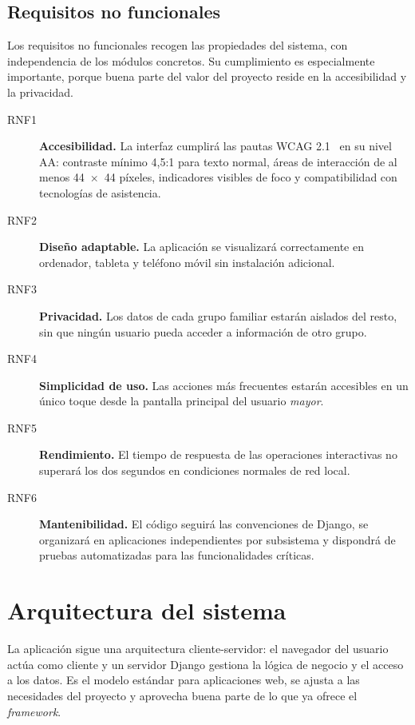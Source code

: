 \subsection{Requisitos no funcionales\label{SUB:REQ_NOFUNCIONALES}}

Los requisitos no funcionales recogen las propiedades del
sistema, con independencia de los módulos concretos. Su cumplimiento es
especialmente importante, porque buena parte del valor del proyecto
reside en la accesibilidad y la privacidad.

\begin{description}
  \item[RNF1] \textbf{Accesibilidad.} La interfaz cumplirá las pautas
  WCAG 2.1~\cite{wcag21} en su nivel AA: contraste mínimo 4{,}5:1 para texto
  normal, áreas de interacción de al menos 44~$\times$~44 píxeles,
  indicadores visibles de foco y compatibilidad con tecnologías de
  asistencia.
  \item[RNF2] \textbf{Diseño adaptable.} La aplicación se visualizará
  correctamente en ordenador, tableta y teléfono móvil sin instalación
  adicional.
  \item[RNF3] \textbf{Privacidad.} Los datos de cada grupo familiar
  estarán aislados del resto, sin que ningún usuario pueda acceder a
  información de otro grupo.
  \item[RNF4] \textbf{Simplicidad de uso.} Las acciones más frecuentes
  estarán accesibles en un único toque desde la pantalla principal del
  usuario \emph{mayor}.
  \item[RNF5] \textbf{Rendimiento.} El tiempo de respuesta de las
  operaciones interactivas no superará los dos segundos en condiciones
  normales de red local.
  \item[RNF6] \textbf{Mantenibilidad.} El código seguirá las convenciones
  de Django, se organizará en aplicaciones independientes por subsistema y
  dispondrá de pruebas automatizadas para las funcionalidades críticas.
\end{description}


\section{Arquitectura del sistema\label{SEC:DIS_ARQUITECTURA}}

La aplicación sigue una arquitectura cliente-servidor: el navegador del
usuario actúa como cliente y un servidor Django gestiona la lógica de
negocio y el acceso a los datos. Es el modelo estándar para aplicaciones
web, se ajusta a las necesidades del proyecto y aprovecha buena parte de
lo que ya ofrece el \emph{framework}.

